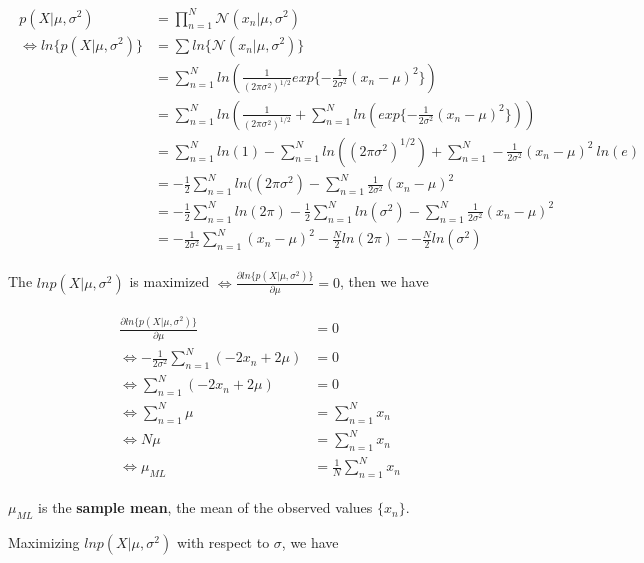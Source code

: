 \begin{align}
    \begin{split}
        p(X|\mu, \sigma^2) & = \prod_{n=1}^N \mathcal{N}(x_n|\mu, \sigma^2)\\
        \Leftrightarrow ln\{p(X|\mu, \sigma^2)\} & = \sum ln \{\mathcal{N}(x_n|\mu, \sigma^2)\}\\
        & = \sum_{n=1}^N ln(\frac{1}{(2\pi \sigma^2)^{1/2}}exp\{-\frac{1}{2\sigma ^ 2}(x_n - \mu)^2\})\\
        & = \sum_{n=1}^N ln(\frac{1}{(2\pi \sigma^2)^{1/2}} + \sum_{n=1}^N ln(exp\{-\frac{1}{2\sigma ^ 2}(x_n - \mu)^2\}))\\
        & = \sum_{n=1}^N ln(1) - \sum_{n=1}^N ln((2\pi \sigma^2)^{1/2}) + \sum_{n=1}^N -\frac{1}{2\sigma ^ 2}(x_n - \mu)^2\ ln(e)\\
        & = - \frac{1}{2} \sum_{n=1}^N ln((2\pi \sigma^2) - \sum_{n=1}^N \frac{1}{2\sigma ^ 2}(x_n - \mu)^2\\
        & = - \frac{1}{2} \sum_{n=1}^N ln(2 \pi) - \frac{1}{2} \sum_{n=1}^N ln(\sigma^2) - \sum_{n=1}^N \frac{1}{2\sigma ^ 2}(x_n - \mu)^2\\
        & = - \frac{1}{2\sigma ^ 2}\sum_{n=1}^N (x_n - \mu)^2 - \frac{N}{2} ln(2 \pi) - - \frac{N}{2} ln(\sigma^2)
    \end{split}
\end{align}

The $lnp(X|\mu, \sigma^2)$ is maximized $\Leftrightarrow \frac{\partial ln\{p(X|\mu, \sigma^2)\}}{\partial \mu} = 0$, then we have

\begin{align}
    \begin{split}
        \frac{\partial ln\{p(X|\mu, \sigma^2)\}}{\partial \mu} & = 0\\
        \Leftrightarrow - \frac{1}{2\sigma ^ 2} \sum_{n=1}^N (-2x_n + 2\mu) & = 0\\
        \Leftrightarrow \sum_{n=1}^N (-2x_n + 2\mu) & = 0\\
        \Leftrightarrow \sum_{n=1}^N \mu & = \sum_{n=1}^N x_n\\
        \Leftrightarrow N \mu & = \sum_{n=1}^N x_n\\
        \Leftrightarrow \mu_{ML} & = \frac{1}{N}\sum_{n=1}^N x_n
    \end{split}
\end{align}

$\mu_{ML}$ is the \textbf{sample mean}, the mean of the observed values $\{x_n\}$.

Maximizing $lnp(X|\mu, \sigma^2)$ with respect to $\sigma$, we have

